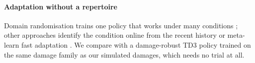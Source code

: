 \paragraph{Adaptation without a repertoire} Domain randomisation trains one policy that works under many conditions
\cite{tobin2017domain,peng2018sim}; other approaches identify the condition online from the recent history
\cite{kumar2021rma,yu2019policy} or meta-learn fast adaptation \cite{nagabandi2019learning}. We compare with a
damage-robust TD3 policy trained on the same damage family as our simulated damages, which needs no trial at all.
